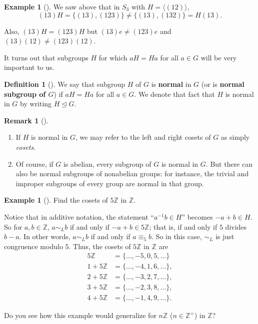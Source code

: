 \documentclass[10pt,]{book}
\newcommand{\terminology}[1]{\textbf{#1}}
\theoremstyle{plain}
\theoremstyle{definition}
\newtheorem{definition}[theorem]{Definition}
\theoremstyle{definition}
\newtheorem{remark}[theorem]{Remark}
\theoremstyle{definition}
\newtheorem{example}[theorem]{Example}
\theoremstyle{definition}
\numberwithin{equation}{section}
\def\Z{\mathbb{Z}}
\def\siml{\sim_L}
\newcommand{\amp}{&}
\begin{document}
\begin{example}[]\label{example-71}
We saw above that in \(S_3\) with \(H=\langle (12)\rangle\),%
\begin{equation*}
(13)H=\{(13),(123)\} \neq \{(13),(132)\}=H(13).
\end{equation*}
%
\par
Also, \((13)H=(123)H\) but \((13)e\neq (123)e\) and \((13)(12)\neq (123)(12)\).%
\end{example}
It turns out that subgroups \(H\) for which \(aH=Ha\) for all \(a\in
G\) will be very important to us.%
\begin{definition}[{}]\label{definition-63}
\label{notation-71}
We say that subgroup \(H\) of \(G\) is \terminology{normal} in \(G\) (or is  \terminology{normal subgroup of \(G\)}) if \(aH=Ha\) for all \(a\in G\). We denote that fact that \(H\) is normal in \(G\) by writing \(H\unlhd G\).%
\end{definition}
\begin{remark}[]\label{remark-40}
\leavevmode%
\begin{enumerate}
\item\hypertarget{li-414}{}If \(H\) is normal in \(G\), we may refer to the left and right cosets of \(G\) as simply \emph{cosets}.%
\item\hypertarget{li-415}{}Of course, if \(G\) is abelian, every subgroup of \(G\) is normal in \(G\). But there can also be normal subgroups of nonabelian groups: for instance, the trivial and improper subgroups of every group are normal in that group.%
\end{enumerate}
%
\end{remark}
\begin{example}[]\label{example-72}
Find the cosets of \(5\Z\) in \(\Z\).%
\par
Notice that in additive notation, the statement ``\(a^{-1}b\in H\)'' becomes \(-a+b\in H\). So for \(a,b\in \Z\), \(a\siml b\) if and only if \(-a+b \in
5\Z\); that is, if and only if \(5\) divides \(b-a\). In other words, \(a\siml b\) if and only if \(a\equiv_5 b\). So in this case, \(\siml\) is just congruence modulo \(5\). Thus, the cosets of \(5\Z\) in \(\Z\) are%
\begin{align*}
5\Z\amp =\{\ldots,-5,0,5,\ldots\}\\
1+5\Z\amp =\{\ldots,-4, 1,
6,\ldots\},\\
2+5\Z\amp =\{\ldots,-3,2, 7,
\ldots\},\\
3+5\Z\amp =\{\ldots,-2,3, 8,
\ldots\},\\
4+5\Z\amp =\{\ldots,-1, 4, 9,
\ldots\}.
\end{align*}
%
\par
Do you see how this example would generalize for \(n\Z\) (\(n \in \Z^+\)) in \(\Z\)?%
\end{example}
\end{document}
